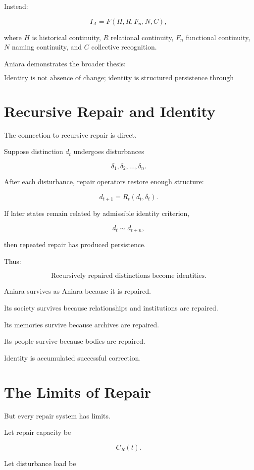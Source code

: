 \documentclass[11pt,oneside]{book}
\theoremstyle{definition}
\theoremstyle{remark}
\begin{document}
Instead:

\[
I_A
=
F(
H,
R,
F_n,
N,
C
),
\]

where \(H\) is historical continuity, \(R\) relational continuity, \(F_n\) functional continuity, \(N\) naming continuity, and \(C\) collective recognition.

Aniara demonstrates the broader thesis:

\[
\boxed{
\text{Identity is not absence of change; identity is structured persistence through change.}
}
\]

\section{Recursive Repair and Identity}

The connection to recursive repair is direct.

Suppose distinction \(d_t\) undergoes disturbances

\[
\delta_1,\delta_2,\ldots,\delta_n.
\]

After each disturbance, repair operators restore enough structure:

\[
d_{t+1}
=
R_t(d_t,\delta_t).
\]

If later states remain related by admissible identity criterion,

\[
d_t\sim d_{t+n},
\]

then repeated repair has produced persistence.

Thus:

\[
\boxed{
\text{Recursively repaired distinctions become identities.}
}
\]

Aniara survives as Aniara because it is repaired.

Its society survives because relationships and institutions are repaired.

Its memories survive because archives are repaired.

Its people survive because bodies are repaired.

Identity is accumulated successful correction.

\section{The Limits of Repair}

But every repair system has limits.

Let repair capacity be

\[
C_R(t).
\]

Let disturbance load be
\end{document}
